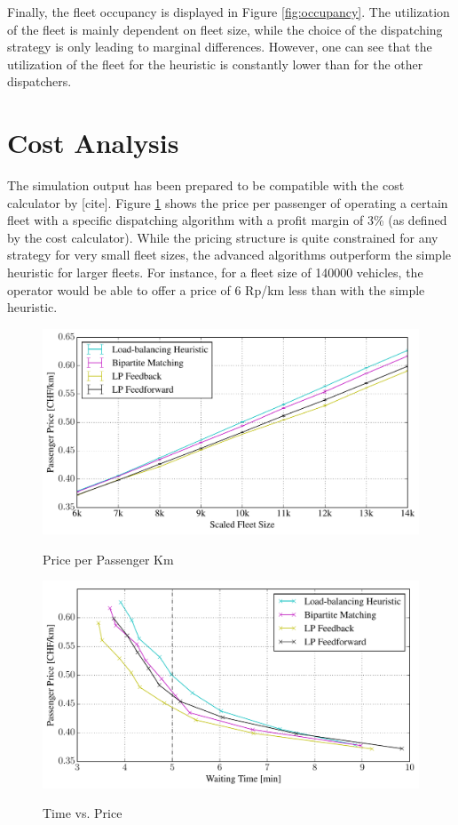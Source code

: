 Finally, the fleet occupancy is displayed in Figure \ref{fig:occupancy}. The utilization of the fleet is mainly dependent on fleet size, while the choice of the dispatching strategy is only leading to marginal differences. However, one can see that the utilization of the fleet for the heuristic is constantly lower than for the other dispatchers.

\section{Cost Analysis}
\label{sec:cost_analysis}

The simulation output has been prepared to be compatible with the cost calculator by [cite]. Figure \ref{fig:passenger_price} shows the price per passenger of operating a certain fleet with a specific dispatching algorithm with a profit margin of 3\% (as defined by the cost calculator). While the pricing structure is quite constrained for any strategy for very small fleet sizes, the advanced algorithms outperform the simple heuristic for larger fleets. For instance, for a fleet size of 140000 vehicles, the operator would be able to offer a price of 6 Rp/km less than with the simple heuristic.

\begin{figure}
\includegraphics[width=1.0\textwidth]{figures/01_passenger_price.pdf}
\label{fig:passenger_price}
\caption{Price per Passenger Km}
\end{figure}

\begin{figure}
\includegraphics[width=1.0\textwidth]{figures/time_vs_price.pdf}
\label{fig:time_vs_price}
\caption{Time vs. Price}
\end{figure}
